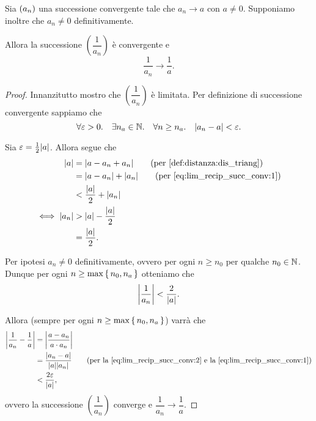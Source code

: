 \begin{proposition}
     \label{prop:lim_recip_succ_conv}
    Sia $\seqn*{a}$ una successione convergente tale che $a_n \to a$ con $a \neq 0$. Supponiamo inoltre che $a_n \neq 0$ definitivamente.

    Allora la successione $\left(\dfrac{1}{a_n}\right)$ è convergente e \[
        \frac{1}{a_n} \to \frac1a.    
    \]
\end{proposition}
\begin{proof}
    Innanzitutto mostro che $\left(\dfrac{1}{a_n}\right)$ è limitata. Per definizione di successione convergente sappiamo che \begin{equation}
       \forall \eps > 0. \quad \exists n_a \in \N. \quad \forall n \geq n_a. \quad \abs*{a_n - a} < \eps. \label{eq:lim_recip_succ_conv:1}
    \end{equation}
    
    Sia $\eps = \frac{1}{2}\abs*{a}$. Allora segue che \begin{align*}
        \abs*{a} &= \abs*{a - a_n + a_n} \tag{per \ref{def:distanza:dis_triang}}\\
        &= \abs*{a - a_n} + \abs*{a_n} \tag{per \eqref{eq:lim_recip_succ_conv:1}}\\
        &< \frac{\abs*{a}}{2} + \abs*{a_n}\\
        \iff \abs*{a_n} &> \abs*{a} - \frac{\abs*{a}}{2} \\
        &= \frac{\abs*{a}}{2}.
    \end{align*}
    
    Per ipotesi $a_n \neq 0$ definitivamente, ovvero per ogni $n \geq n_0$ per qualche $n_0 \in \N$. Dunque per ogni $n \geq \max \set{n_0, n_a}$ otteniamo che \begin{equation}
        \abs*{\frac{1}{a_n}} < \frac{2}{\abs*{a}}. \label{eq:lim_recip_succ_conv:2}
    \end{equation}

    Allora (sempre per ogni $n \geq \max \set{n_0, n_a}$) varrà che \begin{align*}
        \abs*{\frac{1}{a_n} - \frac{1}{a}} &= \abs*{\frac{a - a_n}{a \cdot a_n}}\\
        &= \frac{\abs*{a_n - a}}{\abs{a}\abs{a_n}} \tag{per la \eqref{eq:lim_recip_succ_conv:2} e la \eqref{eq:lim_recip_succ_conv:1}}\\
        &< \frac{2\eps}{\abs*{a}},
    \end{align*}
    ovvero la successione $\left(\dfrac{1}{a_n}\right)$ converge e $\dfrac{1}{a_n} \to \dfrac{1}{a}$.
\end{proof}

